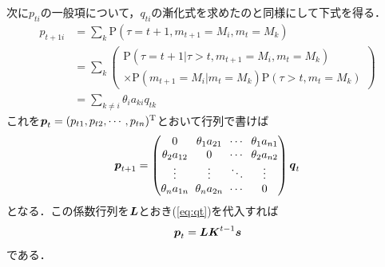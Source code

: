 次に$ p_{t i} $の一般項について，$ q_{t i} $の漸化式を求めたのと同様にして下式を得る．
\begin{align}
    p_{t+1 i} & = \! \sum_{k} \mathrm{P}(\tau = t + 1 , m_{t+1} = M_i , m_t = M_k) \\
    & = \! \sum_{k} \left(
        \begin{array}{l}
            \mathrm{P}(\tau \! = \! t + 1 | \tau \! > \! t , m_{t+1} \! = \! M_i , m_t \! = \! M_k) \\
            \times \mathrm{P}(m_{t+1} \! = \! M_i | m_t \! = \! M_k) \mathrm{P}(\tau \! > \! t , m_t \! = \! M_k)
        \end{array}
    \right) \\
    & = \! \sum_{k \ne i} \theta_i a_{k i} q_{t k} \label{eq:pti_rec}
\end{align}
これを$ \boldsymbol{p}_t = (p_{t 1} , p_{t 2} , \cdots , p_{t n})^\mathrm{T} $とおいて行列で書けば
\begin{equation*}
    \arraycolsep3pt
    \V{p}_{t + 1} = 
    \begin{pmatrix}
        0 & \theta_1 a_{2 1} & \cdots & \theta_1 a_{n 1} \\
        \theta_2 a_{1 2} & 0 & \cdots & \theta_2 a_{n 2} \\
        \vdots & \vdots & \ddots & \vdots \\
        \theta_n a_{1 n} & \theta_n a_{2 n} & \cdots & 0 \\
    \end{pmatrix}
    \V{q}_t
\end{equation*}
となる．この係数行列を$ \boldsymbol{L} $とおき(\ref{eq:qt})を代入すれば
\begin{equation} \label{eq:pt}
    \boldsymbol{p}_t = \boldsymbol{L} \boldsymbol{K}^{t - 1} \boldsymbol{s}
\end{equation}
である．

